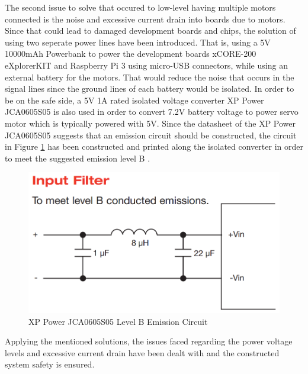 The second issue to solve that occured to low-level having multiple motors connected is the noise and excessive current drain into boards due to motors. Since that could lead to damaged development boards and chips, the solution of using two seperate power lines have been introduced. That is, using a 5V 10000mAh Powerbank to power the development boards xCORE-200 eXplorerKIT and Raspberry Pi 3 using micro-USB connectors, while using an external battery for the motors. That would reduce the noise that occurs in the signal lines since the ground lines of each battery would be isolated. In order to be on the safe side, a 5V 1A rated isolated voltage converter XP Power JCA0605S05 \cite{isolatedvoltageconverter} is also used in order to convert 7.2V battery voltage to power servo motor which is typically powered with 5V. Since the datasheet of the XP Power JCA0605S05 suggests that an emission circuit should be constructed, the circuit in Figure \ref{fig:emissionckt} has been constructed and printed along the isolated converter in order to meet the suggested emission level B \cite{isolatedvoltageconverter}.
\begin{figure}[!ht]
	\centering
	\captionsetup{justification=centering}
	\includegraphics[scale=0.3]{content/images/emissionckt.png}
	\caption{XP Power JCA0605S05 Level B Emission Circuit \cite{isolatedvoltageconverter}}
	\label{fig:emissionckt}
\end{figure}

Applying the mentioned solutions, the issues faced regarding the power voltage levels and excessive current drain have been dealt with and the constructed system safety is ensured.

